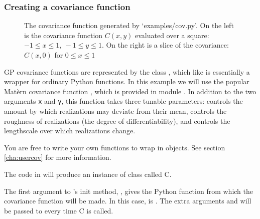 \subsubsection{Creating a covariance function}\label{subsub:cov}
\begin{figure}
    \centering
    \caption{The covariance function generated by {\sffamily `examples/cov.py'}. On the left is the covariance function $C(x,y)$ evaluated over a square: $-1\le x\le 1,\ -1\le y\le 1$. On the right is a slice of the covariance: $C(x,0)$ for $0\le x \le 1$}
    \label{fig:cov}
\end{figure}

GP covariance functions are represented by the class , which like  is essentially a wrapper for ordinary Python functions. In this example we will use the popular Mat\`ern covariance function \cite{banerjee}, which is provided in module . In addition to the two arguments \texttt{x} and \texttt{y}, this function takes three tunable parameters:  controls the amount by which realizations may deviate from their mean,  controls the roughness of realizations (the degree of differentiability), and  controls the lengthscale over which realizations change.

You are free to write your own functions to wrap in  objects. See section \ref{cha:usercov} for more information.

The code in  will produce an instance of class  called C.


The first argument to 's init method, , gives the Python function from which the covariance function will be made. In this case,  is . The extra arguments  and  will be passed to  every time C is called.

